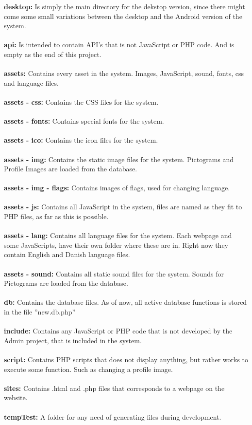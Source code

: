 \textbf{desktop:} Is simply the main directory for the dekstop version, since there might come some small variations between the desktop and the Android version of the system.\\
\\
\textbf{api:} Is intended to contain API's that is not JavaScript or PHP code. And is empty as the end of this project.\\
\\
\textbf{assets:} Contains every asset in the system. Images, JavaScript, sound, fonts, css and language files.\\
\\
\textbf{assets - css:} Contains the CSS files for the system.\\
\\
\textbf{assets - fonts:} Contains special fonts for the system.\\
\\
\textbf{assets - ico:} Contains the icon files for the system.\\
\\
\textbf{assets - img:} Contains the static image files for the system. Pictograms and Profile Images are loaded from the database.\\
\\
\textbf{assets - img - flags:} Contains images of flags, used for changing language.\\
\\
\textbf{assets - js:} Contains all JavaScript in the system, files are named as they fit to PHP files, as far as this is possible.\\
\\
\textbf{assets - lang:} Contains all language files for the system. Each webpage and some JavaScripts, have their own folder where these are in. Right now they contain English and Danish language files.\\
\\
\textbf{assets - sound:} Contains all static sound files for the system. Sounds for Pictograms are loaded from the database.\\
\\
\textbf{db:} Contains the database files. As of now, all active database functions is stored in the file ''new.db.php''\\
\\
\textbf{include:} Contains any JavaScript or PHP code that is not developed by the Admin project, that is included in the system.\\
\\
\textbf{script:} Contains PHP scripts that does not display anything, but rather works to execute some function. Such as changing a profile image.\\
\\
\textbf{sites:} Contains .html and .php files that corresponds to a webpage on the website.\\
\\
\textbf{tempTest:} A folder for any need of generating files during development.


